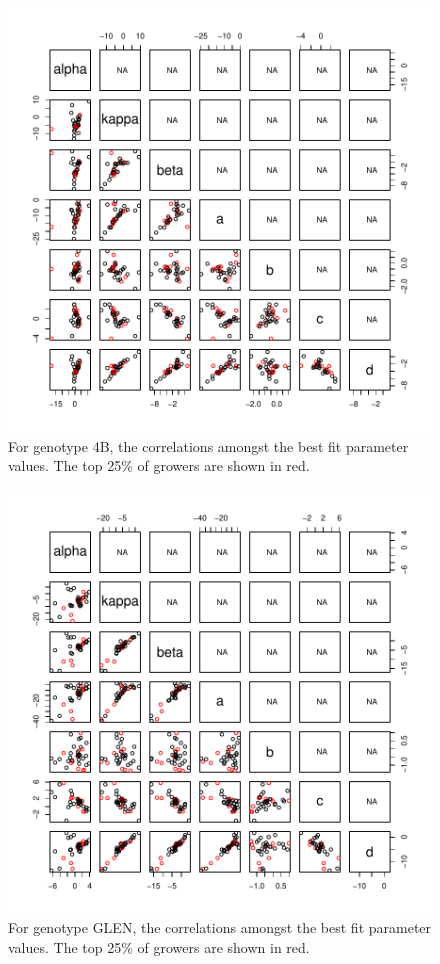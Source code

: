 \documentclass[12pt,reqno,final]{amsart}
\theoremstyle{plain}
\numberwithin{equation}{part}
\begin{document}
\begin{figure}
\includegraphics{Comparing_best_fit_parameters_against_Adriana_winners_and_losers-008}
\caption{For genotype 4B, the correlations amongst the best fit
  parameter values. The top 25\% of growers are shown in red.}
\end{figure}

\begin{figure}
\includegraphics{Comparing_best_fit_parameters_against_Adriana_winners_and_losers-009}
\caption{For genotype GLEN, the correlations amongst the best fit
  parameter values. The top 25\% of growers are shown in red.}
\end{figure}
\end{document}

